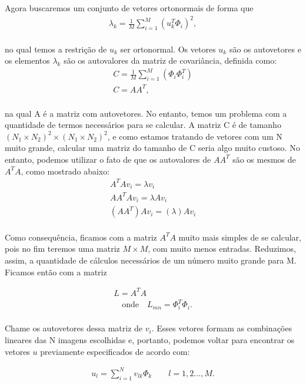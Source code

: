 \documentclass{article}
\begin{document}
Agora buscaremos um conjunto de vetores ortonormais de forma que 
\begin{gather*}
    \lambda_{k} = \frac{1}{M}\sum_{i=1}^{M}(u_{k}^T\Phi_{i})^2,
\end{gather*}\\
no qual temos a restrição de $u_{k}$ ser ortonormal.
Os vetores $u_{k}$ são os autovetores e os elementos $\lambda_{k}$ são os autovalores da matriz de covariância, definida como:\\
\begin{gather*}
    C = \frac{1}{M}\sum_{i=1}^{M}(\Phi_{i} \Phi_{i}^T)\\
    C = AA^T,
\end{gather*}\\
na qual A é a matriz com autovetores. 
No entanto, temos um problema com a quantidade de termos necessários para se calcular. A matriz C é de tamanho $(N_{1}\times N_{2})^2 \times (N_{1}\times N_{2})^2$, e como estamos tratando de vetores com um N muito grande, calcular uma matriz do tamanho de C seria algo muito custoso. No entanto, podemos utilizar o fato de que os autovalores de $AA^T$
são os mesmos de $A^TA$, como mostrado abaixo:
\begin{gather*}
    A^TAv_{i} = \lambda v_{i}\\
    AA^TAv_{i} = \lambda Av_{i}\\
    (AA^T)Av_{i} = (\lambda) Av_{i}
\end{gather*}\\

Como consequência, ficamos com a matriz $A^TA$ muito mais simples de se calcular, pois no fim teremos uma matriz $M \times M$, com muito menos entradas. Reduzimos, assim, a quantidade de cálculos necessários de um número muito grande para M. Ficamos então com a matriz

\begin{gather*}
    L = A^TA\\
    \quad \text{onde}\quad L_{mn} = \Phi_{i}^T \Phi_{i}.
\end{gather*}\\

Chame os autovetores dessa matriz de $v_{i}$. Esses vetores formam as combinações lineares das N imagens escolhidas e, portanto, podemos voltar para encontrar os vetores $u$ previamente especificados de acordo com:

\begin{gather*}
    u_{l}= \sum_{i=1}^{N}v_{lk}\Phi_{k}  \quad     \quad   l = 1,2 ..., M.
\end{gather*}
\end{document}

